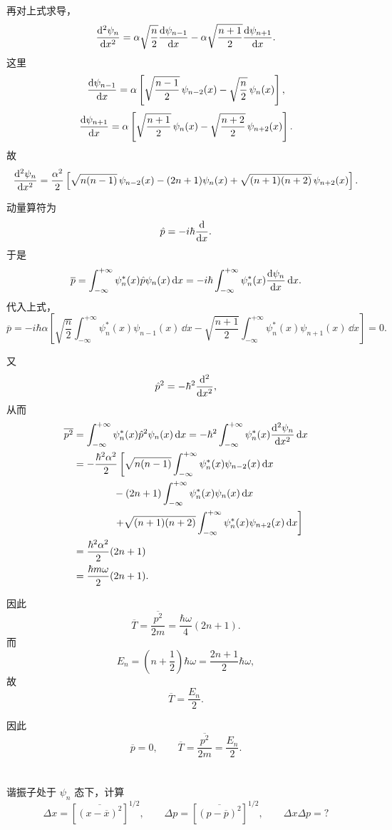 \documentclass[12pt,a4paper]{article}
\begin{document}
再对上式求导，
\[
\dv[2]{\psi_n}{x}
=
\alpha\sqrt{\frac{n}{2}}\dv{\psi_{n-1}}{x}
-\alpha\sqrt{\frac{n+1}{2}}\dv{\psi_{n+1}}{x}.
\]
这里
\[
\dv{\psi_{n-1}}{x}
=
\alpha\left[ \sqrt{\frac{n-1}{2}}\,\psi_{n-2}(x)-\sqrt{\frac{n}{2}}\,\psi_n(x) \right],
\]
\[
\dv{\psi_{n+1}}{x}
=
\alpha\left[ \sqrt{\frac{n+1}{2}}\,\psi_n(x)-\sqrt{\frac{n+2}{2}}\,\psi_{n+2}(x) \right].
\]
故
\[
\dv[2]{\psi_n}{x}
=
\frac{\alpha^2}{2}\left[
\sqrt{n(n-1)}\,\psi_{n-2}(x)
-(2n+1)\psi_n(x)
+\sqrt{(n+1)(n+2)}\,\psi_{n+2}(x)
\right].
\]

动量算符为
\[
\hat{p}=-i\hbar \dv{}{x}.
\]
于是
\[
\overline{p}
=
\int_{-\infty}^{+\infty}\psi_n^*(x)\hat{p}\psi_n(x)\, \dd x
=
-i\hbar\int_{-\infty}^{+\infty}\psi_n^*(x)\dv{\psi_n}{x}\, \dd x.
\]
代入上式，
\[
\overline{p}
=
-i\hbar\alpha\left[
\sqrt{\frac{n}{2}}\int_{-\infty}^{+\infty}\psi_n^*(x)\psi_{n-1}(x)\, \dd x
-\sqrt{\frac{n+1}{2}}\int_{-\infty}^{+\infty}\psi_n^*(x)\psi_{n+1}(x)\, \dd x
\right]=0.
\]

又
\[
\hat{p}^2=-\hbar^2 \dv[2]{}{x},
\]
从而
\begin{align*}
  \overline{p^2}
&=
\int_{-\infty}^{+\infty}\psi_n^*(x)\hat{p}^2\psi_n(x)\, \dd x
=
-\hbar^2\int_{-\infty}^{+\infty}\psi_n^*(x)\dv[2]{\psi_n}{x}\, \dd x\\
&=-\frac{\hbar^2\alpha^2}{2}\left[
\sqrt{n(n-1)}\int_{-\infty}^{+\infty}\psi_n^*(x)\psi_{n-2}(x)\, \dd x \right.\\
&\qquad \qquad-(2n+1)\int_{-\infty}^{+\infty}\psi_n^*(x)\psi_n(x)\, \dd x \\
&\qquad \qquad \left.+\sqrt{(n+1)(n+2)}\int_{-\infty}^{+\infty}\psi_n^*(x)\psi_{n+2}(x)\, \dd x\right]\\
&=\frac{\hbar^2\alpha^2}{2}(2n+1)\\
&=\frac{\hbar m\omega}{2}(2n+1).
\end{align*}

因此
\[
\overline{T}
=
\frac{\overline{p^2}}{2m}
=
\frac{\hbar\omega}{4}(2n+1).
\]
而
\[
E_n=\left( n+\frac{1}{2} \right)\hbar\omega=\frac{2n+1}{2}\hbar\omega,
\]
故
\[
\overline{T}=\frac{E_n}{2}.
\]

因此
\[
\overline{p}=0,
\qquad
\overline{T}=\frac{\overline{p^2}}{2m}=\frac{E_n}{2}.
\]


\section{}
谐振子处于 $\psi_n$ 态下，计算
\[
\Delta x=\left[\overline{(x-\overline{x})^2}\right]^{1/2},\qquad
\Delta p=\left[\overline{(p-\overline{p})^2}\right]^{1/2},\qquad
\Delta x\Delta p=?
\]
\end{document}
